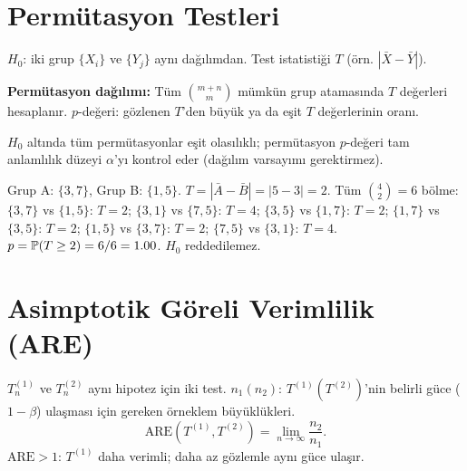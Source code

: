 \section{Permütasyon Testleri}
\label{sec:permutasyon_test}

\begin{tanim}\label{def:permutasyon_test}
$H_0$: iki grup $\{X_i\}$ ve $\{Y_j\}$ aynı dağılımdan. Test istatistiği $T$ (örn. $|\bar{X}-\bar{Y}|$).

\textbf{Permütasyon dağılımı:} Tüm $\binom{m+n}{m}$ mümkün grup atamasında $T$ değerleri hesaplanır. $p$-değeri: gözlenen $T$'den büyük ya da eşit $T$ değerlerinin oranı.
\end{tanim}

\begin{teorem}
$H_0$ altında tüm permütasyonlar eşit olasılıklı; permütasyon $p$-değeri tam anlamlılık düzeyi $\alpha$'yı kontrol eder (dağılım varsayımı gerektirmez).
\end{teorem}

\begin{ornek}
Grup A: $\{3,7\}$, Grup B: $\{1,5\}$. $T=|\bar{A}-\bar{B}|=|5-3|=2$. Tüm $\binom{4}{2}=6$ bölme: $\{3,7\}$ vs $\{1,5\}$: $T=2$; $\{3,1\}$ vs $\{7,5\}$: $T=4$; $\{3,5\}$ vs $\{1,7\}$: $T=2$; $\{1,7\}$ vs $\{3,5\}$: $T=2$; $\{1,5\}$ vs $\{3,7\}$: $T=2$; $\{7,5\}$ vs $\{3,1\}$: $T=4$. $p=\mathbb{P}(T\geq2)=6/6=1.00$. $H_0$ reddedilemez.
\end{ornek}

\section{Asimptotik Göreli Verimlilik (ARE)}
\label{sec:are}

\begin{tanim}[ARE]\label{def:are}
$T_n^{(1)}$ ve $T_n^{(2)}$ aynı hipotez için iki test. $n_1(n_2)$: $T^{(1)}(T^{(2)})$'nin belirli güce ($1-\beta$) ulaşması için gereken örneklem büyüklükleri.
\[
  \mathrm{ARE}(T^{(1)},T^{(2)}) = \lim_{n\to\infty}\frac{n_2}{n_1}.
\]
$\mathrm{ARE}>1$: $T^{(1)}$ daha verimli; daha az gözlemle aynı güce ulaşır.
\end{tanim}

